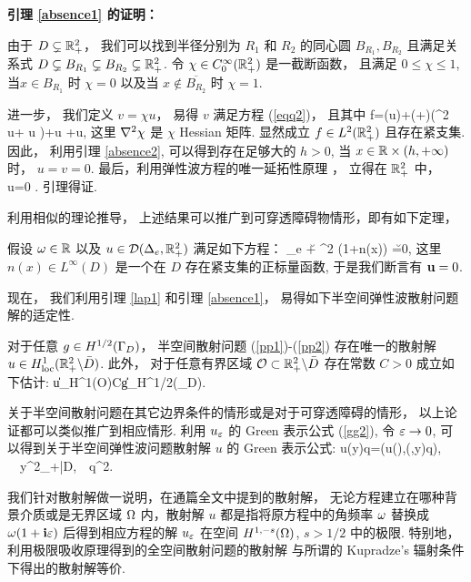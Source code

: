 {\noindent \bf 引理 \ref{absence1} 的证明：} 

由于 $D\subsetneq\mathbb{R}^2_+$， 我们可以找到半径分别为 $R_1$ 和 $R_2$ 的同心圆 $B_{R_1},B_{R_2}$ 且满足关系式 $D\subsetneq B_{R_1}\subsetneq B_{R_2}  \subsetneq \mathbb{R}^2_+$.  令 $\chi \in C_{0}^{\infty}(\mathbb{R}^2_+)$ 是一截断函数， 且满足 $0 \leq \chi \leq 1$,当$x\in B_{R_1}$ 时 $\chi=0$  以及当 $x\notin \overline{B_{R_2}}$ 时 $\chi=1$. 

进一步， 我们定义 $v=\chi u$，
易得 $v$ 满足方程 (\ref{eqq2})， 且其中
\ben
f=\sigma(u)\na\chi+(\lambda+\mu)(\na^2 \chi u+ \na u \na\chi)+\mu\Delta\chi u +\mu\div u\na\chi,
\een
 这里 $\nabla^2 \chi$ 是 $\chi$ Hessian 矩阵.  显然成立 $f\in L^2(\mathbb{R}^2_+)$ 且存在紧支集.  因此， 利用引理 \ref{absence2}, 可以得到存在足够大的 $h>0$, 当 $x\in \mathbb{R}\times(h,+\infty)$ 时， $u=v=0$.  最后，利用弹性波方程的唯一延拓性原理 \cite{Morassi2001STRONG}，
立得在 $\mathbb{R}^2_+$ 中， u=0 .  引理得证. 
\finproof

利用相似的理论推导， 上述结果可以推广到可穿透障碍物情形，即有如下定理，
\begin{lem}
	假设 $\omega\in \mathbb{R}$ 以及 $u\in \mathcal{D}(\Delta_e,\mathbb{R}^2_+)$ 满足如下方程： 
	\ben
	\De_e \u + \om^2 (1+n(x)) \u =0,
	\een
	这里 $n(x)\in L^{\infty}(D)$ 是一个在 $D$ 存在紧支集的正标量函数,
	于是我们断言有 $\mathbf{u}=0$.
\end{lem}


现在， 我们利用引理 \ref{lap1} 和引理 \ref{absence1}， 易得如下半空间弹性波散射问题解的适定性. 
\begin{thm} \label{thm:4.1}\label{lap2}
	对于任意 $g \in H^{1/2}(\Gamma_D)$， 半空间散射问题 (\ref{pp1})-(\ref{pp2})
	存在唯一的散射解 $u\in H^{1}_{\rm loc}(\mathbb{R}^2_+ \backslash \bar D)$. 此外， 对于任意有界区域 $\mathcal O\subset \mathbb{R}^2_+\backslash\bar D$ 存在常数 $C>0$ 成立如下估计:
	\ben
	\|u\|_{H^{1}(\mathcal O)}\le C\|g\|_{H^{1/2}(\Ga_D)}.
	\een
\end{thm}

关于半空间散射问题在其它边界条件的情形或是对于可穿透障碍的情形， 以上论证都可以类似推广到相应情形. 利用 $u_\varepsilon$ 的 Green 表示公式 (\ref{gg2}), 令 $\varepsilon\to 0$, 可以得到关于半空间弹性波问题散射解 $u$ 的 Green 表示公式: 
\be\label{g2}
u(y)\cdot q=\GG(u(\cdot),\N(\cdot,y)q), \ \ \forall y\in\R^2_+\bks\bar D,\ \ \forall q\in\R^2.
\ee
\begin{remark}
	我们针对散射解做一说明，在通篇全文中提到的散射解， 无论方程建立在哪种背景介质或是无界区域 $\Omega
	$ 内，散射解 $u$ 都是指将原方程中的角频率 $\omega$ 替换成 $\omega(1+\mathbf{i}\varepsilon)$ 后得到相应方程的解 $u_\varepsilon$ 在空间 $H^{1,-s}(\Omega)$, $s>1/2$ 中的极限. 特别地， 利用极限吸收原理得到的全空间散射问题的散射解 \cite{leis, cxz2016} 与所谓的 Kupradze's 辐射条件下得出的散射解等价. 
\end{remark}

